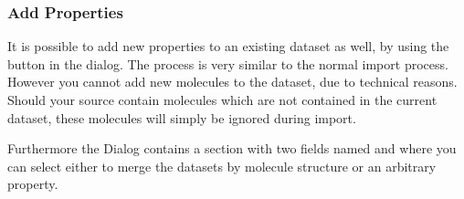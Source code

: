 \subsubsection{Add Properties} 
It is possible to add new properties to an existing dataset as well, by using the  button in the  dialog. The process is very similar to the normal import process. However you cannot add new molecules to the dataset, due to technical reasons. Should your source contain molecules which are not contained in the current dataset, these molecules will simply be ignored during import.

Furthermore the  Dialog contains a section  with two fields named  and  where you can select either to merge the datasets by molecule structure or an arbitrary property.